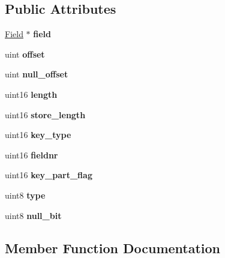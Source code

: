 \subsection*{Public Attributes}
\begin{DoxyCompactItemize}
\item 
\mbox{\label{classKEY__PART__INFO_ae70a71bcc8c1e37423d7d14c3ec402f6}} 
\mbox{\hyperlink{classField}{Field}} $\ast$ {\bfseries field}
\item 
\mbox{\label{classKEY__PART__INFO_a4b18d1beb0e002f357939aee0c27a9c5}} 
uint {\bfseries offset}
\item 
\mbox{\label{classKEY__PART__INFO_a72e5c9eb6ed4b1ccab2304c6953f8bfa}} 
uint {\bfseries null\+\_\+offset}
\item 
\mbox{\label{classKEY__PART__INFO_adc8a18f4bbd4c7970d699c0e963033fa}} 
uint16 {\bfseries length}
\item 
\mbox{\label{classKEY__PART__INFO_ae099f6890b71e6e9d97c750ff7aa3025}} 
uint16 {\bfseries store\+\_\+length}
\item 
\mbox{\label{classKEY__PART__INFO_ad71ecd2960a5e8746ebae7a3646a2420}} 
uint16 {\bfseries key\+\_\+type}
\item 
\mbox{\label{classKEY__PART__INFO_ad75c5729987262b19617db84f3194599}} 
uint16 {\bfseries fieldnr}
\item 
\mbox{\label{classKEY__PART__INFO_aea1587ba4aaf63474e217fdce7c05135}} 
uint16 {\bfseries key\+\_\+part\+\_\+flag}
\item 
\mbox{\label{classKEY__PART__INFO_a3d2bc3d6777c8f1a64b978fe583edbb6}} 
uint8 {\bfseries type}
\item 
\mbox{\label{classKEY__PART__INFO_afb4b1b1d911060a68e76bea91b3a3722}} 
uint8 {\bfseries null\+\_\+bit}
\end{DoxyCompactItemize}


\subsection{Member Function Documentation}
\mbox{\label{classKEY__PART__INFO_a2e9833a3f8ee214bb0d9b7b7c982fe6f}} 
